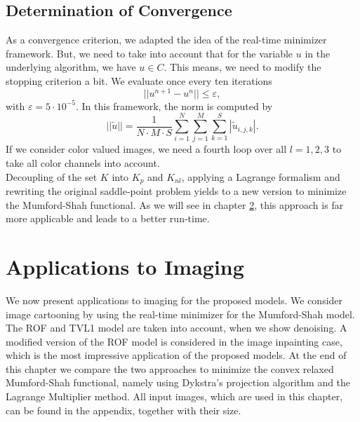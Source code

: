 \documentclass{scrreprt}
\begin{document}

    \section{Determination of Convergence} %
    \label{sec:determination_of_convergence}
    
        As a convergence criterion, we adapted the idea of the real-time minimizer framework. But, we need to take into account that for the variable $u$ in the underlying algorithm, we have $u \in C$. This means, we need to modify the stopping criterion a bit. We evaluate once every ten iterations
                $$
                    ||u^{n+1} - u^{n}|| \le \varepsilon,
                $$
            with $\varepsilon = 5 \cdot 10^{-5}$. In this framework, the norm is computed by
                $$
                    ||\tilde{u}|| = \frac{1}{N \cdot M \cdot S} \sum_{i = 1}^{N} \sum_{j = 1}^{M} \sum_{k = 1}^{S} |\tilde{u}_{i,j,k}|.
                $$
            If we consider color valued images, we need a fourth loop over all $l = 1, 2, 3$ to take all color channels into account.\\


    Decoupling of the set $K$ into $K_{p}$ and $K_{nl}$, applying a Lagrange formalism and rewriting the original saddle-point problem yields to a new version to minimize the Mumford-Shah functional. As we will see in chapter \ref{cha:applications_to_imaging}, this approach is far more applicable and leads to a better run-time.


\chapter{Applications to Imaging} %
\label{cha:applications_to_imaging}

    We now present applications to imaging for the proposed models. We consider image cartooning by using the real-time minimizer for the Mumford-Shah model. The ROF and TVL1 model are taken into account, when we show denoising. A modified version of the ROF model is considered in the image inpainting case, which is the most impressive application of the proposed models. At the end of this chapter we compare the two approaches to minimize the convex relaxed Mumford-Shah functional, namely using Dykstra's projection algorithm and the Lagrange Multiplier method. All input images, which are used in this chapter, can be found in the appendix, together with their size.
\end{document}

